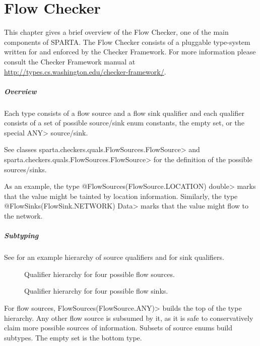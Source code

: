 \htmlhr
\chapter{Flow Checker\label{flow-checker}}

This chapter gives a brief overview of the Flow Checker, one of
the main components of SPARTA.  The Flow Checker consists of a pluggable 
type-system written for and enforced by the Checker Framework.  For more 
information please consult the Checker Framework manual at
\url{http://types.cs.washington.edu/checker-framework/}.  

\paragraph{Overview}

Each type consists of a flow source and a flow sink qualifier and each
qualifier consists of a set of possible source/sink enum constants,
the empty set, or the special \<ANY> source/sink.

See classes
\<sparta.checkers.quals.FlowSources.FlowSource> and\\
\<sparta.checkers.quals.FlowSources.FlowSource> for the definition of
the possible sources/sinks.

As an example, the type
\<@FlowSources(FlowSource.LOCATION) double>
marks that the value might be tainted by location information.
Similarly, the type
\<@FlowSinks(FlowSink.NETWORK) Data>
marks that the value might flow to the network.


\paragraph{Subtyping}

See  for an example hierarchy of
source qualifiers and  for sink
qualifiers.


\begin{figure}
\caption{Qualifier hierarchy for four possible flow sources.}
\label{fig:flowsources-hierarchy}
\end{figure}

\begin{figure}
\caption{Qualifier hierarchy for four possible flow sinks.}
\label{fig:flowsinks-hierarchy}
\end{figure}

For flow sources, \<FlowSources(FlowSource.ANY)> builds the top of the
type hierarchy. Any other flow source is subsumed by it, as it is safe
to conservatively claim more possible sources of information.
Subsets of source enums build subtypes.
The empty set is the bottom type.


